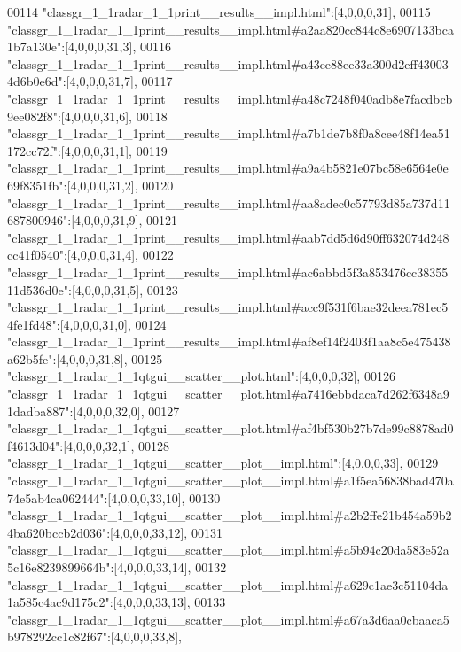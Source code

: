 \begin{DoxyCode}
00114 \textcolor{stringliteral}{"classgr\_1\_1radar\_1\_1print\_\_results\_\_impl.html"}:[4,0,0,0,31],
00115 \textcolor{stringliteral}{"classgr\_1\_1radar\_1\_1print\_\_results\_\_impl.html#a2aa820cc844c8e6907133bca1b7a130e"}:[4,0,0,0,31,3],
00116 \textcolor{stringliteral}{"classgr\_1\_1radar\_1\_1print\_\_results\_\_impl.html#a43ee88ee33a300d2eff430034d6b0e6d"}:[4,0,0,0,31,7],
00117 \textcolor{stringliteral}{"classgr\_1\_1radar\_1\_1print\_\_results\_\_impl.html#a48c7248f040adb8e7facdbcb9ee082f8"}:[4,0,0,0,31,6],
00118 \textcolor{stringliteral}{"classgr\_1\_1radar\_1\_1print\_\_results\_\_impl.html#a7b1de7b8f0a8cee48f14ea51172cc72f"}:[4,0,0,0,31,1],
00119 \textcolor{stringliteral}{"classgr\_1\_1radar\_1\_1print\_\_results\_\_impl.html#a9a4b5821e07bc58e6564e0e69f8351fb"}:[4,0,0,0,31,2],
00120 \textcolor{stringliteral}{"classgr\_1\_1radar\_1\_1print\_\_results\_\_impl.html#aa8adec0c57793d85a737d11687800946"}:[4,0,0,0,31,9],
00121 \textcolor{stringliteral}{"classgr\_1\_1radar\_1\_1print\_\_results\_\_impl.html#aab7dd5d6d90ff632074d248cc41f0540"}:[4,0,0,0,31,4],
00122 \textcolor{stringliteral}{"classgr\_1\_1radar\_1\_1print\_\_results\_\_impl.html#ac6abbd5f3a853476cc3835511d536d0e"}:[4,0,0,0,31,5],
00123 \textcolor{stringliteral}{"classgr\_1\_1radar\_1\_1print\_\_results\_\_impl.html#acc9f531f6bae32deea781ec54fe1fd48"}:[4,0,0,0,31,0],
00124 \textcolor{stringliteral}{"classgr\_1\_1radar\_1\_1print\_\_results\_\_impl.html#af8ef14f2403f1aa8c5e475438a62b5fe"}:[4,0,0,0,31,8],
00125 \textcolor{stringliteral}{"classgr\_1\_1radar\_1\_1qtgui\_\_scatter\_\_plot.html"}:[4,0,0,0,32],
00126 \textcolor{stringliteral}{"classgr\_1\_1radar\_1\_1qtgui\_\_scatter\_\_plot.html#a7416ebbdaca7d262f6348a91dadba887"}:[4,0,0,0,32,0],
00127 \textcolor{stringliteral}{"classgr\_1\_1radar\_1\_1qtgui\_\_scatter\_\_plot.html#af4bf530b27b7de99c8878ad0f4613d04"}:[4,0,0,0,32,1],
00128 \textcolor{stringliteral}{"classgr\_1\_1radar\_1\_1qtgui\_\_scatter\_\_plot\_\_impl.html"}:[4,0,0,0,33],
00129 \textcolor{stringliteral}{"classgr\_1\_1radar\_1\_1qtgui\_\_scatter\_\_plot\_\_impl.html#a1f5ea56838bad470a74e5ab4ca062444"}:[4,0,0,0,33,10],
00130 \textcolor{stringliteral}{"classgr\_1\_1radar\_1\_1qtgui\_\_scatter\_\_plot\_\_impl.html#a2b2ffe21b454a59b24ba620bccb2d036"}:[4,0,0,0,33,12],
00131 \textcolor{stringliteral}{"classgr\_1\_1radar\_1\_1qtgui\_\_scatter\_\_plot\_\_impl.html#a5b94c20da583e52a5c16e8239899664b"}:[4,0,0,0,33,14],
00132 \textcolor{stringliteral}{"classgr\_1\_1radar\_1\_1qtgui\_\_scatter\_\_plot\_\_impl.html#a629c1ae3c51104da1a585c4ac9d175c2"}:[4,0,0,0,33,13],
00133 \textcolor{stringliteral}{"classgr\_1\_1radar\_1\_1qtgui\_\_scatter\_\_plot\_\_impl.html#a67a3d6aa0cbaaca5b978292cc1c82f67"}:[4,0,0,0,33,8],

\end{DoxyCode}
